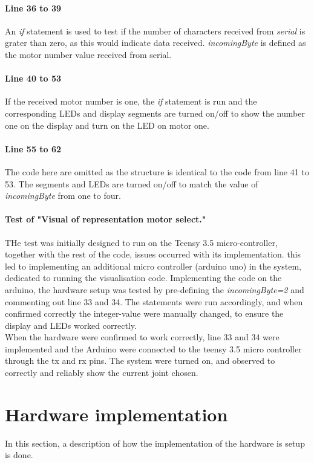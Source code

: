 \paragraph{Line 36 to 39} An \textit{if} statement is used to test if the number of characters received from \textit{serial} is grater than zero, as this would indicate data received. \textit{incomingByte} is defined as the motor number value received from serial.

\paragraph{Line 40 to 53} If the received motor number is one, the \textit{if} statement is run and the corresponding LEDs and display segments are turned on/off to show the number one on the display and turn on the LED on motor one. 

\paragraph{Line 55 to 62} The code here are omitted as the structure is identical to the code from line 41 to 53. The segments and LEDs are turned on/off to match the value of \textit{incomingByte} from one to four.

\paragraph{Test of "Visual of representation motor select."}
THe test was initially designed to run on the Teensy 3.5 micro-controller, together with the rest of the code, issues occurred with its implementation. this led to implementing an additional micro controller (arduino uno) in the system, dedicated to running the visualisation code. 
Implementing the code on the arduino, the hardware setup was tested by pre-defining the \textit{incomingByte=2} and commenting out line 33 and 34. The statements were run accordingly, and when confirmed correctly the integer-value were manually changed, to ensure the display and LEDs worked correctly.\\
When the hardware were confirmed to work correctly, line 33 and 34 were implemented and the Arduino were connected to the teensy 3.5 micro controller through the tx and rx pins. The system were turned on, and observed to correctly and reliably show the current joint chosen.


\section{Hardware implementation}
In this section, a description of how the implementation of the hardware is setup is done.
